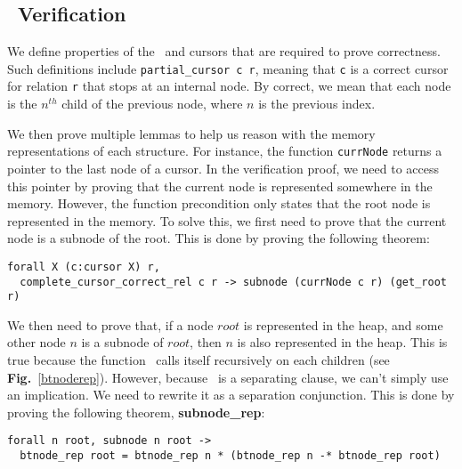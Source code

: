 \subsection{\btrees\ Verification}
We define properties of the \btrees\ and cursors that are required to prove correctness.
Such definitions include \texttt{partial\_cursor c r}, meaning that \texttt{c} is a correct cursor for relation \texttt{r} that stops at an internal node.
By correct, we mean that each node is the $n^{th}$ child of the previous node, where $n$ is the previous index.

We then prove multiple lemmas to help us reason with the memory representations of each structure.
For instance, the function \texttt{currNode} returns a pointer to the last node of a cursor.
In the verification proof, we need to access this pointer by proving that the current node is represented somewhere in the memory.
However, the function precondition only states that the root node is represented in the memory.
To solve this, we first need to prove that the current node is a subnode of the root.
This is done by proving the following theorem:
\begin{lstlisting}[language=Coq]
  forall X (c:cursor X) r,
  complete_cursor_correct_rel c r -> subnode (currNode c r) (get_root r)
\end{lstlisting}

We then need to prove that, if a node $root$ is represented in the heap, and some other node $n$ is a subnode of $root$, then $n$ is also represented in the heap.
This is true because the function \btrep\ calls itself recursively on each children (see \textbf{Fig.}~\ref{btnoderep}).
However, because \btrep\ is a separating clause, we can't simply use an implication. We need to rewrite it as a separation conjunction.
This is done by proving the following theorem, \textbf{subnode\_rep}:

\begin{lstlisting}[language=Coq]
  forall n root, subnode n root ->
  btnode_rep root = btnode_rep n * (btnode_rep n -* btnode_rep root)
\end{lstlisting}



